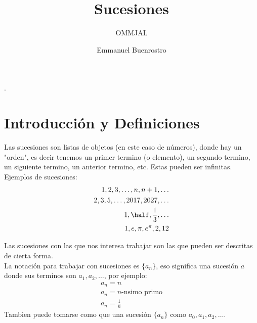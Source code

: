 \documentclass[11pt]{scrartcl}
\title{Sucesiones}
\subtitle{OMMJAL}
\author{Emmanuel Buenrostro}
\begin{document}
\maketitle.

\section{Introducci\'on y Definiciones}

Las sucesiones son listas de objetos (en este caso de n\'umeros), donde hay un "orden", es decir tenemos un primer termino (o elemento), un segundo termino, un siguiente termino, un anterior termino, etc. Estas pueden ser infinitas.\\

Ejemplos de sucesiones:
\begin{align*}
1, 2, 3,  \ldots , n, n+1, \ldots  \\
2, 3, 5,  \ldots, 2017, 2027, \ldots \\
1, \half, \frac 13 , \ldots \\
1, e, \pi, e^{\pi}, 2, 12 
\end{align*}

Las sucesiones con las que nos interesa trabajar son las que pueden ser descritas de cierta forma. \\
La notaci\'on para trabajar con sucesiones es $\{a_n\}$, eso significa una sucesi\'on $a$ donde sus terminos son
$a_1, a_2, \ldots$, por ejemplo:
\begin{align*}
a_n=n \\
a_n= n\text{-nsimo primo} \\
a_n= \frac 1n 
\end{align*}
Tambien puede tomarse como que una sucesi\'on $\{a_n\}$ como $a_0, a_1, a_2, \ldots$.
\end{document}
